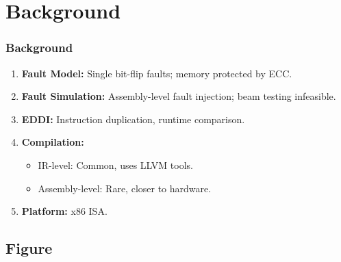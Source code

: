 \documentclass[
	12pt, %
]{beamer}
\begin{document}

\section{Background}
\begin{frame}
	\frametitle{Background}
	\begin{enumerate}
		\item \textbf{Fault Model:}
		Single bit-flip faults; memory protected by ECC.
		
		\item \textbf{Fault Simulation:}
		Assembly-level fault injection; beam testing infeasible.
		
		\item \textbf{EDDI:}
		Instruction duplication, runtime comparison.
		
		\item \textbf{Compilation:}
		\begin{itemize}
			\item IR-level: Common, uses LLVM tools.
			\item Assembly-level: Rare, closer to hardware.
		\end{itemize}
		
		\item \textbf{Platform:} x86 ISA.
	\end{enumerate}
\end{frame}


%	





\subsection{Figure}
\end{document}
